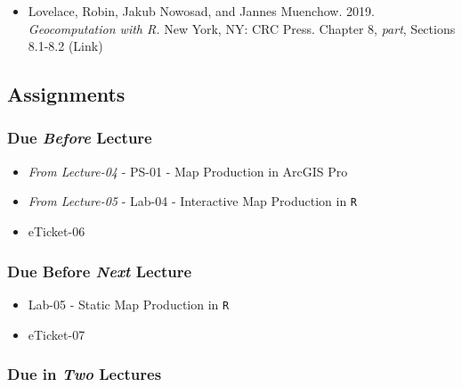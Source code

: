\documentclass[]{book}
\providecommand{\tightlist}{%
  \setlength{\itemsep}{0pt}\setlength{\parskip}{0pt}}
\begin{document}
\begin{itemize}
\tightlist
\item
  Lovelace, Robin, Jakub Nowosad, and Jannes Muenchow. 2019. \emph{Geocomputation with R.} New York, NY: CRC Press. Chapter 8, \emph{part}, Sections 8.1-8.2 (Link)
\end{itemize}

\hypertarget{assignments-7}{%
\subsection*{Assignments}\label{assignments-7}}

\hypertarget{due-before-lecture-5}{%
\subsubsection*{\texorpdfstring{Due \emph{Before} Lecture}{Due Before Lecture}}\label{due-before-lecture-5}}

\begin{itemize}
\tightlist
\item
  \emph{From Lecture-04} - PS-01 - Map Production in ArcGIS Pro
\item
  \emph{From Lecture-05} - Lab-04 - Interactive Map Production in \texttt{R}
\item
  eTicket-06
\end{itemize}

\hypertarget{due-before-next-lecture-4}{%
\subsubsection*{\texorpdfstring{Due Before \emph{Next} Lecture}{Due Before Next Lecture}}\label{due-before-next-lecture-4}}

\begin{itemize}
\tightlist
\item
  Lab-05 - Static Map Production in \texttt{R}
\item
  eTicket-07
\end{itemize}

\hypertarget{due-in-two-lectures-2}{%
\subsubsection*{\texorpdfstring{Due in \emph{Two} Lectures}{Due in Two Lectures}}\label{due-in-two-lectures-2}}
\end{document}
